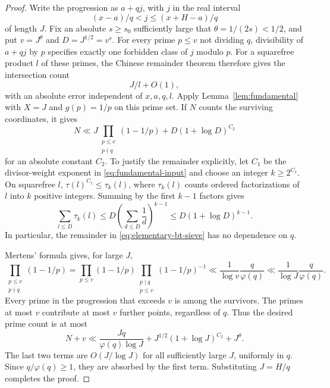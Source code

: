 \begin{proof}
Write the progression as $a+qj$, with $j$ in the real interval
\[
 (x-a)/q<j\le(x+H-a)/q
\]
of length $J$.  Fix an absolute $s\ge s_0$ sufficiently large that
$\theta=1/(2s)<1/2$, and put $v=J^\theta$ and $D=J^{1/2}=v^s$.
For every prime $p\le v$ not dividing $q$, divisibility of $a+qj$
by $p$ specifies exactly one forbidden class of $j$ modulo $p$.
For a squarefree product $l$ of these primes, the Chinese remainder
theorem therefore gives the intersection count
\[
 J/l+O(1),
\]
with an absolute error independent of $x,a,q,l$.
Apply Lemma~\ref{lem:fundamental} with $X=J$ and $g(p)=1/p$ on
this prime set.  If $N$ counts the surviving coordinates, it gives
\begin{equation}\label{eq:elementary-bt-sieve}
 N\ll J\prod_{\substack{p\le v\\p\nmid q}}(1-1/p)
       +D(1+\log D)^{C_2}
\end{equation}
for an absolute constant $C_2$.
To justify the remainder explicitly, let $C_1$ be the divisor-weight
exponent in \eqref{eq:fundamental-input} and choose an integer
$k\ge2^{C_1}$.  On squarefree $l$,
$\tau(l)^{C_1}\le\tau_k(l)$, where $\tau_k(l)$ counts ordered
factorizations of $l$ into $k$ positive integers.  Summing by the
first $k-1$ factors gives
\[
 \sum_{l\le D}\tau_k(l)
 \le D\left(\sum_{d\le D}\frac1d\right)^{k-1}
 \le D(1+\log D)^{k-1}.
\]
In particular, the remainder in \eqref{eq:elementary-bt-sieve}
has no dependence on $q$.

Mertens' formula gives, for large $J$,
\[
 \prod_{\substack{p\le v\\p\nmid q}}(1-1/p)
 =\prod_{p\le v}(1-1/p)
       \prod_{\substack{p\mid q\\p\le v}}(1-1/p)^{-1}
 \ll\frac1{\log v}\frac q{\varphi(q)}
 \ll\frac1{\log J}\frac q{\varphi(q)}.
\]
Every prime in the progression that exceeds $v$ is among the
survivors.  The primes at most $v$ contribute at most $v$ further
points, regardless of $q$.  Thus the desired prime count is at most
\[
 N+v\ll \frac{Jq}{\varphi(q)\log J}
          +J^{1/2}(1+\log J)^{C_2}+J^\theta.
\]
The last two terms are $O(J/\log J)$ for all sufficiently large
$J$, uniformly in $q$.  Since $q/\varphi(q)\ge1$, they are absorbed
by the first term.  Substituting $J=H/q$ completes the proof.
\end{proof}
